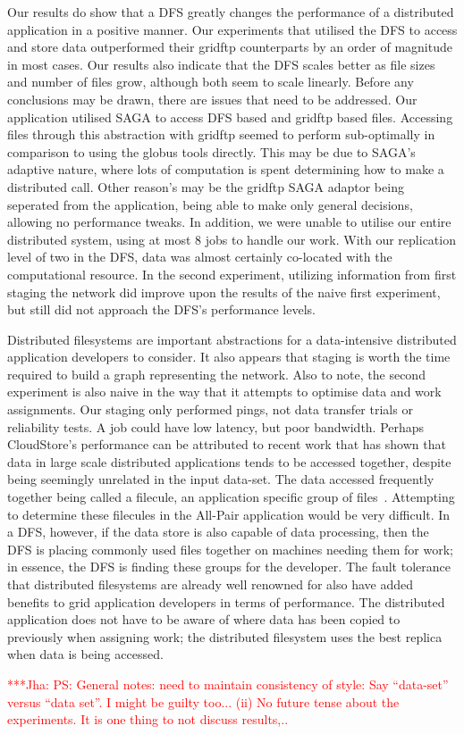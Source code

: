 \documentclass[a4paper,11pt]{article}
\newcommand{\jhanote}[1]{ {\textcolor{red} { ***Jha: #1 }}}
\newcommand{\jhanote}[1]{}
\begin{document}
Our results do show that a DFS greatly changes the performance of a distributed application in a positive manner. Our experiments that utilised the DFS to access and store data outperformed their gridftp counterparts by an order of magnitude in most cases. Our results also indicate that the DFS scales better as file sizes and number of files grow, although both seem to scale linearly. Before any conclusions may be drawn, there are issues that need to be addressed. Our application utilised SAGA to access DFS based and gridftp based files. Accessing files through this abstraction with gridftp seemed to perform sub-optimally in comparison to using the globus tools directly. This may be due to SAGA's adaptive nature, where lots of computation is spent determining how to make a distributed call. Other reason's may be the gridftp SAGA adaptor being seperated from the application, being able to make only general decisions, allowing no performance tweaks. In addition, we were unable to utilise our entire distributed system, using at most 8 jobs to handle our work. With our replication level of two in the DFS, data was almost certainly co-located with the computational resource. In the second experiment, utilizing information from first staging the network did improve upon the results of the naive first experiment, but still did not approach the DFS's performance levels.

Distributed filesystems are important abstractions for a data-intensive distributed application developers to consider. It also appears that staging is worth the time required to build a graph representing the network. Also to note, the second experiment is also naive in the way that it attempts to optimise data and work assignments. Our staging only performed pings, not data transfer trials or reliability tests. A job could have low latency, but poor bandwidth. Perhaps CloudStore's performance can be attributed to recent work that has shown that data in large scale distributed applications tends to be accessed together, despite being seemingly unrelated in the input data-set. The data accessed frequently together being called a filecule, an application specific group of files~\cite{filecule}. Attempting to determine these filecules in the All-Pair application would be very difficult. In a DFS, however, if the data store is also capable of data processing, then the DFS is placing commonly used files together on machines needing them for work; in essence, the DFS is finding these groups for the developer. The fault tolerance that distributed filesystems are already well renowned for also have added benefits to grid application developers in terms of performance. The distributed application does not have to be aware of where data has been copied to previously when assigning work; the distributed filesystem uses the best replica when data is being accessed.


\jhanote{PS: General notes: need to maintain consistency of style: Say ``data-set'' versus ``data set''. I might be guilty too...  (ii) No future tense about the
experiments. It is one thing to not discuss results,.. }


 

\end{document}
